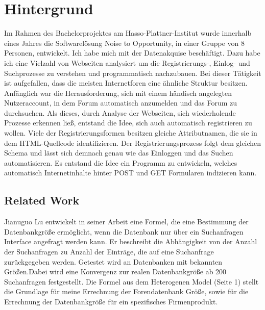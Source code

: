 \section{Hintergrund}

Im Rahmen des Bachelorprojektes am Hasso-Plattner-Institut wurde innerhalb eines Jahres die Softwarelösung Noise to Opportunity, in einer Gruppe von 8 Personen, entwickelt. Ich habe mich mit der Datenakquise beschäftigt. Dazu habe ich eine Vielzahl von Webseiten analysiert um die Registrierungs-, Einlog- und Suchprozesse zu verstehen und programmatisch nachzubauen. Bei dieser Tätigkeit ist aufgefallen, dass die meisten Internetforen eine ähnliche Struktur besitzen. Anfänglich war die Herausforderung, sich mit einem händisch angelegten Nutzeraccount, in dem Forum automatisch anzumelden und das Forum zu durchsuchen. Als dieses, durch Analyse der Webseiten, sich wiederholende Prozesse erkennen ließ, entstand die Idee, sich auch automatisch registrieren zu wollen.
Viele der Registrierungsformen besitzen gleiche Attributnamen, die sie in dem HTML-Quellcode identifizieren. Der Registrierungsprozess folgt dem gleichen Schema und lässt sich demnach genau wie das Einloggen und das Suchen automatisieren. Es entstand die Idee ein Programm zu entwickeln, welches automatisch Internetinhalte hinter POST und GET Formularen indizieren kann.

\subsection{Related Work}

Jianuguo Lu \cite{lu2008efficient} entwickelt in seiner Arbeit eine Formel, die eine Bestimmung der Datenbankgröße ermöglicht, wenn die Datenbank nur über ein Suchanfragen Interface angefragt werden kann. Er beschreibt die Abhängigkeit von der Anzahl der Suchanfragen zu Anzahl der Einträge, die auf eine Suchanfrage zurückgegeben werden. Getestet wird an Datenbanken mit bekannten Größen.Dabei wird eine Konvergenz zur realen Datenbankgröße ab 200 Suchanfragen festgestellt. Die Formel aus dem Heterogenen Model (Seite 1) stellt die Grundlage für meine Errechnung der Forendatenbank Größe, sowie für die Errechnung der Datenbankgröße für ein spezifisches Firmenprodukt.


